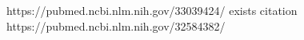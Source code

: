 https://pubmed.ncbi.nlm.nih.gov/33039424/  exists citation
https://pubmed.ncbi.nlm.nih.gov/32584382/